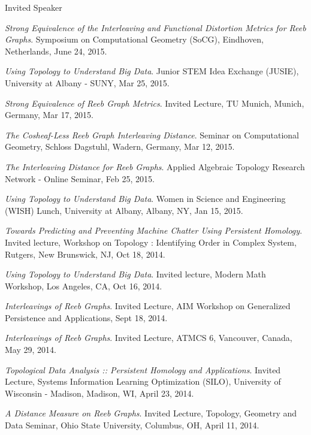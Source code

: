 \documentclass{resume} %
\begin{document}
\begin{rSection}{Invited Speaker}
\begin{etaremune}
\item\emph{Strong Equivalence of the Interleaving and Functional Distortion Metrics for Reeb Graphs}. Symposium on Computational Geometry (SoCG), Eindhoven, Netherlands, June 24, 2015. 

\item\emph{Using Topology to Understand Big Data}. Junior STEM Idea Exchange (JUSIE), University at Albany - SUNY, Mar 25, 2015. 

\item\emph{Strong Equivalence of Reeb Graph Metrics}. Invited Lecture, TU Munich, Munich, Germany, Mar 17, 2015. 

\item\emph{The Cosheaf-Less Reeb Graph Interleaving Distance}. Seminar on Computational Geometry, Schloss Dagstuhl, Wadern, Germany, Mar 12, 2015. 

\item\emph{The Interleaving Distance for Reeb Graphs}. Applied Algebraic Topology Research Network - Online Seminar, Feb 25, 2015. 

\item\emph{Using Topology to Understand Big Data}. Women in Science and Engineering (WISH) Lunch, University at Albany, Albany, NY, Jan 15, 2015. 

\item\emph{Towards Predicting and Preventing Machine Chatter Using Persistent Homology}. Invited lecture, Workshop on Topology : Identifying Order in Complex System, Rutgers, New Brunswick, NJ, Oct 18, 2014. 

\item\emph{Using Topology to Understand Big Data}. Invited lecture, Modern Math Workshop, Los Angeles, CA, Oct 16, 2014. 

\item\emph{Interleavings of Reeb Graphs}. Invited Lecture, AIM Workshop on Generalized Persistence and Applications, Sept 18, 2014. 

\item\emph{Interleavings of Reeb Graphs}. Invited Lecture, ATMCS 6, Vancouver, Canada, May 29, 2014. 

\item\emph{Topological Data Analysis :: Persistent Homology and Applications}. Invited Lecture, Systems Information Learning Optimization (SILO), University of Wisconsin - Madison, Madison, WI, April 23, 2014. 

\item\emph{A Distance Measure on Reeb Graphs}. Invited Lecture, Topology, Geometry and Data Seminar, Ohio State University, Columbus, OH, April 11, 2014. 


\end{etaremune}
\end{rSection}
\end{document}
